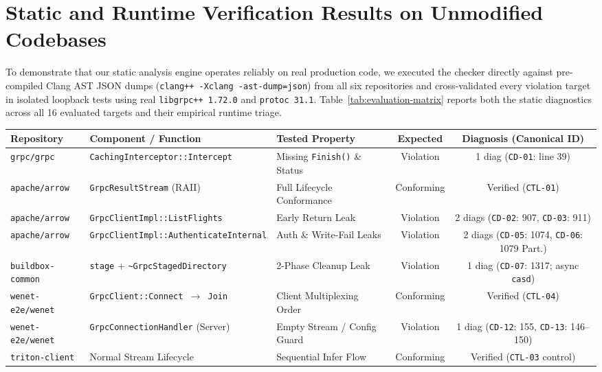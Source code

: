 \documentclass[11pt,a4paper]{article}
\begin{document}
\section{Static and Runtime Verification Results on Unmodified Codebases}

To demonstrate that our static analysis engine operates reliably on real production code, we executed the checker directly against pre-compiled Clang AST JSON dumps (\texttt{clang++ -Xclang -ast-dump=json}) from all six repositories and cross-validated every violation target in isolated loopback tests using real \texttt{libgrpc++ 1.72.0} and \texttt{protoc 31.1}. Table~\ref{tab:evaluation-matrix} reports both the static diagnostics across all 16 evaluated targets and their empirical runtime triage.

\begin{table}[htbp]
\centering
\footnotesize
\begin{tabular}{@{}lllcc@{}}
\toprule
\textbf{Repository} & \textbf{Component / Function} & \textbf{Tested Property} & \textbf{Expected} & \textbf{Diagnosis (Canonical ID)} \\
\midrule
\texttt{grpc/grpc} & \texttt{CachingInterceptor::Intercept} & Missing \texttt{Finish()} \& Status & Violation & 1 diag (\texttt{CD-01}: line 39) \\
\texttt{apache/arrow} & \texttt{GrpcResultStream} (RAII) & Full Lifecycle Conformance & Conforming & Verified (\texttt{CTL-01}) \\
\texttt{apache/arrow} & \texttt{GrpcClientImpl::ListFlights} & Early Return Leak & Violation & 2 diags (\texttt{CD-02}: 907, \texttt{CD-03}: 911) \\
\texttt{apache/arrow} & \texttt{GrpcClientImpl::AuthenticateInternal} & Auth \& Write-Fail Leaks & Violation & 2 diags (\texttt{CD-05}: 1074, \texttt{CD-06}: 1079 Part.) \\
\texttt{buildbox-common} & \texttt{stage} + \texttt{\~{}GrpcStagedDirectory} & 2-Phase Cleanup Leak & Violation & 1 diag (\texttt{CD-07}: 1317; async \texttt{casd}) \\
\texttt{wenet-e2e/wenet} & \texttt{GrpcClient::Connect $\to$ Join} & Client Multiplexing Order & Conforming & Verified (\texttt{CTL-04}) \\
\texttt{wenet-e2e/wenet} & \texttt{GrpcConnectionHandler} (Server) & Empty Stream / Config Guard & Violation & 1 diag (\texttt{CD-12}: 155, \texttt{CD-13}: 146--150) \\
\texttt{triton-client} & Normal Stream Lifecycle & Sequential Infer Flow & Conforming & Verified (\texttt{CTL-03} control) \\

\end{tabular}
\end{table}
\end{document}
